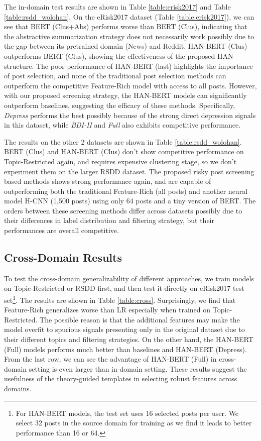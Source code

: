 The in-domain test results are shown in Table \ref{table:erisk2017} and Table \ref{table:rsdd_wolohan}. On the eRisk2017 dataset (Table \ref{table:erisk2017}), we can see that BERT (Clus+Abs) performs worse than BERT (Clus), indicating that the abstractive summarization strategy does not necessarily work possibly due to the gap between its pretrained domain (News) and Reddit. HAN-BERT (Clus) outperforms BERT (Clus), showing the effectiveness of the proposed HAN structure. The poor performance of HAN-BERT (last) highlights the importance of post selection, and none of the traditional post selection methods can outperform the competitive Feature-Rich model with access to all posts. However, with our proposed screening strategy, the HAN-BERT models can significantly outperform baselines, suggesting the efficacy of these methods. Specifically, \textit{Depress} performs the best possibly because of the strong direct depression signals in this dataset, while \textit{BDI-II} and \textit{Full} also exhibits competitive performance.

The results on the other 2 datasets are shown in Table \ref{table:rsdd_wolohan}. BERT (Clus) and HAN-BERT (Clus) don't show competitive performance on Topic-Restricted again, and requires expensive clustering stage, so we don't experiment them on the larger RSDD dataset. The proposed risky post screening based methods shows strong performance again, and are capable of outperforming both the traditional Feature-Rich (all posts) and another neural model H-CNN (1,500 posts) using only 64 posts and a tiny version of BERT. The orders between these screening methods differ across datasets possibly due to their differences in label distribution and filtering strategy, but their performances are overall competitive.


\subsection{Cross-Domain Results}

To test the cross-domain generalizability of different approaches, we train models on Topic-Restricted or RSDD first, and then test it directly on eRisk2017 test set\footnote{For HAN-BERT models, the test set uses 16 selected posts per user. We select 32 posts in the source domain for training as we find it leads to better performance than 16 or 64.}. The results are shown in Table \ref{table:cross}. Surprisingly, we find that Feature-Rich generalizes worse than LR especially when trained on Topic-Restricted. The possible reason is that the additional features may make the model overfit to spurious signals presenting only in the original dataset due to their different topics and filtering strategies. On the other hand, the HAN-BERT (Full) models performs much better than baselines and HAN-BERT (Depress). From the last row, we can see the advantage of HAN-BERT (Full) in cross-domain setting is even larger than in-domain setting. These results suggest the usefulness of the theory-guided templates in selecting robust features across domains.

